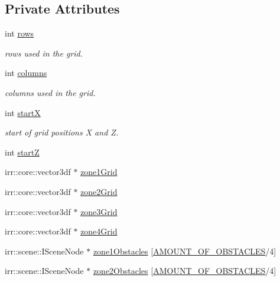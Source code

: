 \subsection*{Private Attributes}
\begin{DoxyCompactItemize}
\item 
int \hyperlink{class_object_placement_generation_a9de1ce3954d2a5aff10af4e88bb26516}{rows}
\begin{DoxyCompactList}\small\item\em rows used in the grid. \end{DoxyCompactList}\item 
int \hyperlink{class_object_placement_generation_a872cbf261b7aac7c6f9c570b56d92acd}{columns}
\begin{DoxyCompactList}\small\item\em columns used in the grid. \end{DoxyCompactList}\item 
int \hyperlink{class_object_placement_generation_a265fa21c083b78b5c98410436ff33d72}{start\-X}
\begin{DoxyCompactList}\small\item\em start of grid positions X and Z. \end{DoxyCompactList}\item 
int \hyperlink{class_object_placement_generation_aa0632a6f68c075e03d6a8c6551f53e4c}{start\-Z}
\item 
irr\-::core\-::vector3df $\ast$ \hyperlink{class_object_placement_generation_aad1c9c2a56afd002bb8b551232292d65}{zone1\-Grid}
\item 
irr\-::core\-::vector3df $\ast$ \hyperlink{class_object_placement_generation_a2dbfd8e1e0b6dc2e25c0dd8207f473c7}{zone2\-Grid}
\item 
irr\-::core\-::vector3df $\ast$ \hyperlink{class_object_placement_generation_ad315e69d1bbacdfc0c3dfabcc02511b0}{zone3\-Grid}
\item 
irr\-::core\-::vector3df $\ast$ \hyperlink{class_object_placement_generation_a1422711f765890659a9fb0250a8e693c}{zone4\-Grid}
\item 
irr\-::scene\-::\-I\-Scene\-Node $\ast$ \hyperlink{class_object_placement_generation_a2718f963a994625bafdc65c84cb821ef}{zone1\-Obstacles} \mbox{[}\hyperlink{_object_placement_generation_8h_ae3ce5573806c4a01f588d56bfec823cb}{A\-M\-O\-U\-N\-T\-\_\-\-O\-F\-\_\-\-O\-B\-S\-T\-A\-C\-L\-E\-S}/4\mbox{]}
\item 
irr\-::scene\-::\-I\-Scene\-Node $\ast$ \hyperlink{class_object_placement_generation_aaa6c6df1104c971c4879534da1e0df7e}{zone2\-Obstacles} \mbox{[}\hyperlink{_object_placement_generation_8h_ae3ce5573806c4a01f588d56bfec823cb}{A\-M\-O\-U\-N\-T\-\_\-\-O\-F\-\_\-\-O\-B\-S\-T\-A\-C\-L\-E\-S}/4\mbox{]}

\end{DoxyCompactItemize}
